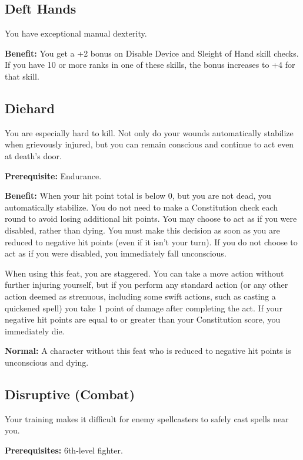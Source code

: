 \subsection{Deft Hands}

				
You have exceptional manual dexterity.
				
\textbf{Benefit:} You get a +2 bonus on Disable Device and Sleight of Hand skill checks. If you have 10 or more ranks in one of these skills, the bonus increases to +4 for that skill.
				
\subsection{Diehard}

				
You are especially hard to kill. Not only do your wounds automatically stabilize when grievously injured, but you can remain conscious and continue to act even at death's door.
				
\textbf{Prerequisite:} Endurance.
				
\textbf{Benefit:} When your hit point total is below 0, but you are not dead, you automatically stabilize. You do not need to make a Constitution check each round to avoid losing additional hit points. You may choose to act as if you were disabled, rather than dying. You must make this decision as soon as you are reduced to negative hit points (even if it isn't your turn). If you do not choose to act as if you were disabled, you immediately fall unconscious.

When using this feat, you are staggered. You can take a move action without further injuring yourself, but if you perform any standard action (or any other action deemed as strenuous, including some swift actions, such as casting a quickened spell) you take 1 point of damage after completing the act. If your negative hit points are equal to or greater than your Constitution score, you immediately die.
				
\textbf{Normal:} A character without this feat who is reduced to negative hit points is unconscious and dying.
				
\subsection{Disruptive (Combat)}

				
Your training makes it difficult for enemy spellcasters to safely cast spells near you.
				
\textbf{Prerequisites:} 6th-level fighter.
				
